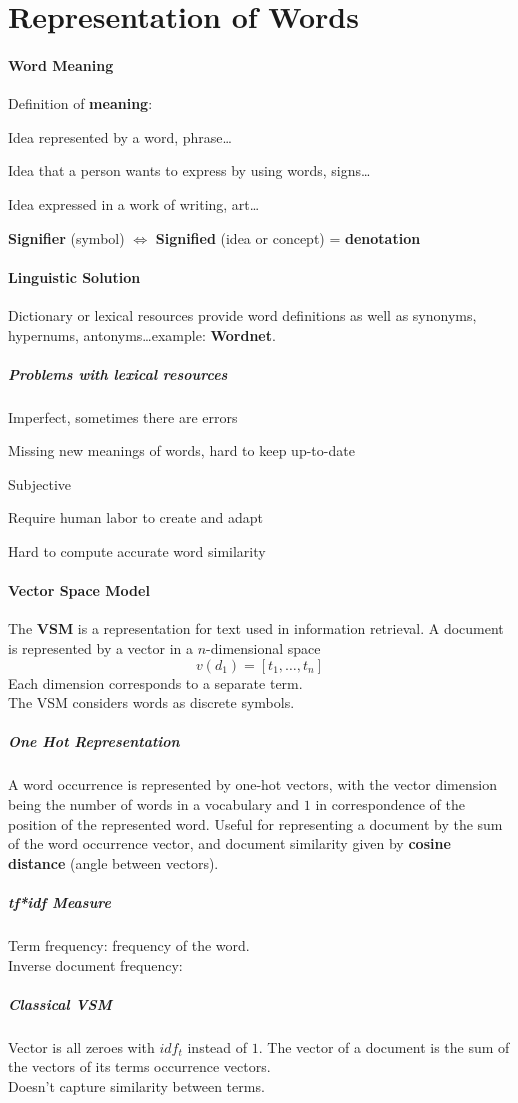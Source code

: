 \documentclass[10pt]{report}
\begin{document}
\section{Representation of Words}
\paragraph{Word Meaning} Definition of \textbf{meaning}:\begin{list}{}{}
	\item Idea represented by a word, phrase\ldots
	\item Idea that a person wants to express by using words, signs\ldots
	\item Idea expressed in a work of writing, art\ldots
\end{list}
\textbf{Signifier} (symbol) $\Leftrightarrow$ \textbf{Signified} (idea or concept) = \textbf{denotation}
\paragraph{Linguistic Solution} Dictionary or lexical resources provide word definitions as well as synonyms, hypernums, antonyms\ldots example: \textbf{Wordnet}.
\subparagraph{Problems with lexical resources} \begin{list}{}{}
	\item Imperfect, sometimes there are errors
	\item Missing new meanings of words, hard to keep up-to-date
	\item Subjective
	\item Require human labor to create and adapt
	\item Hard to compute accurate word similarity
\end{list}
\paragraph{Vector Space Model} The \textbf{VSM} is a representation for text used in information retrieval. A document is represented by a vector in a $n$-dimensional space $$v(d_1) = [t_1,\ldots, t_n]$$
Each dimension corresponds to a separate term.\\
The VSM considers words as discrete symbols.
\subparagraph{One Hot Representation} A word occurrence is represented by one-hot vectors, with the vector dimension being the number of words in a vocabulary and $1$ in correspondence of the position of the represented word. Useful for representing a document by the sum of the word occurrence vector, and document similarity given by \textbf{cosine distance} (angle between vectors).
\subparagraph{tf*idf Measure} Term frequency: frequency of the word.\\
Inverse document frequency: %
\subparagraph{Classical VSM} Vector is all zeroes with $idf_t$ instead of $1$. The vector of a document is the sum of the vectors of its terms occurrence vectors.\\
Doesn't capture similarity between terms.
\end{document}
